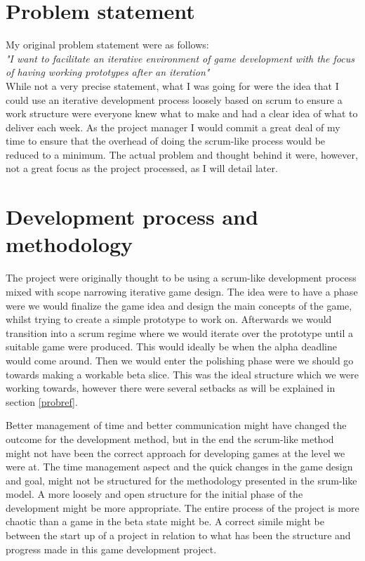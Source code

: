 \documentclass[a4paper,11pt]{article}
\begin{document}
\section{Problem statement} %
My original problem statement were as follows:\\
\textit{"I want to facilitate an iterative environment of game development with the focus of having working prototypes after an iteration"}\\
While not a very precise statement, what I was going for were the idea that I could use an iterative development process loosely based on scrum to ensure a work structure were everyone knew what to make and had a clear idea of what to deliver each week. 
As the project manager I would commit a great deal of my time to ensure that the overhead of doing the scrum-like process would be reduced to a minimum. 
The actual problem and thought behind it were, however, not a great focus as the project processed, as I will detail later.

\section{Development process and methodology} %
The project were originally thought to be using a scrum-like development process mixed with scope narrowing iterative game design. The idea were to have a phase were we would finalize the game idea and design the main concepts of the game, whilst trying to create a simple prototype to work on. Afterwards we would transition into a scrum regime where we would iterate over the prototype until a suitable game were produced. This would ideally be when the alpha deadline would come around. Then we would enter the polishing phase were we should go towards making a workable beta slice. 
This was the ideal structure which we were working towards, however there were several setbacks as will be explained in section \ref{probref}.

Better management of time and better communication might have changed the outcome for the development method, but in the end the scrum-like method might not have been the correct approach for developing games at the level we were at. The time management aspect and the quick changes in the game design and goal, might not be structured for the methodology presented in the srum-like model. A more loosely and open structure for the initial phase of the development might be more appropriate. The entire process of the project is more chaotic than a game in the beta state might be. A correct simile might be between the start up of a project in relation to what has been the structure and progress made in this game development project.
\end{document}
